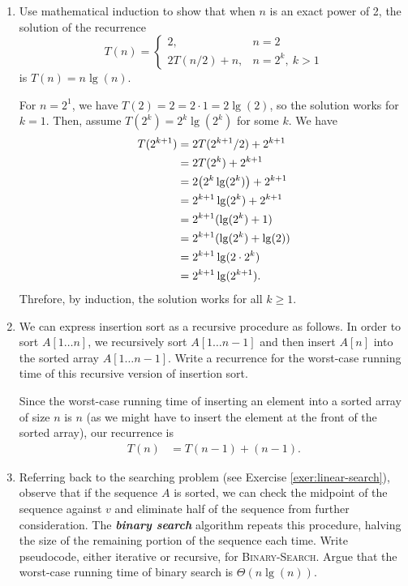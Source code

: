 \documentclass[Chapter02]{subfiles}
\begin{document}
\begin{enumerate}[leftmargin=\labelsep]
		\item Use mathematical induction to show that when $n$ is an exact power of 2, the solution of the recurrence
		\[
			T(n) = 
			\begin{cases}
				2, & n = 2\\
				2T(n / 2) + n, & n = 2^k,\ k > 1
			\end{cases}
		\]
		is $T(n) = n\lg(n)$.
		\begin{answer}
			For $n = 2^1$, we have $T(2) = 2 = 2 \cdot 1 = 2 \lg(2)$, so the solution works for $k = 1$. Then, assume $T(2^k) = 2^k \lg(2^k)$ for some $k$. We have
			\begin{align*}
				T(2^{k + 1}) &= 2T(2^{k+1} / 2) + 2^{k + 1}\\
					&=  2T(2^k) + 2^{k + 1}\\
					&= 2\qty(2^k \lg(2^k)) + 2^{k + 1}\\
					&= 2^{k + 1} \lg(2^k) + 2^{k + 1}\\
					&= 2^{k + 1}(\lg(2^k) + 1)\\
					&= 2^{k + 1}(\lg(2^k) + \lg(2))\\
					&= 2^{k + 1}\lg(2 \cdot 2^k)\\
					&= 2^{k + 1}\lg(2^{k + 1}).
			\end{align*}
			Threfore, by induction, the solution works for all $k \geq 1$.
		\end{answer}

		\item We can express insertion sort as a recursive procedure as follows. In order to sort $A[1 \dots n]$, we recursively sort $A[1 \dots n-1]$ and then insert $A[n]$ into the sorted array $A[1 \dots n-1]$. Write a recurrence for the worst-case running time of this recursive version of insertion sort.
		\begin{answer}
			Since the worst-case running time of inserting an element into a sorted array of size $n$ is $n$ (as we might have to insert the element at the front of the sorted array), our recurrence is
			\begin{align*}
				T(n) &= T(n - 1) + (n - 1).
			\end{align*}
		\end{answer}

		\item \label{exer:binary-search} Referring back to the searching problem (see Exercise \ref{exer:linear-search}), observe that if the sequence $A$ is sorted, we can check the midpoint of the sequence against $v$ and eliminate half of the sequence from further consideration. The \textbf{\textit{binary search}} algorithm repeats this procedure, halving the size of the remaining portion of the sequence each time. Write pseudocode, either iterative or recursive, for \textsc{Binary-Search}. Argue that the worst-case running time of binary search is $\Theta(n \lg(n))$.
		\begin{answer}
			

\end{answer}
\end{enumerate}
\end{document}
